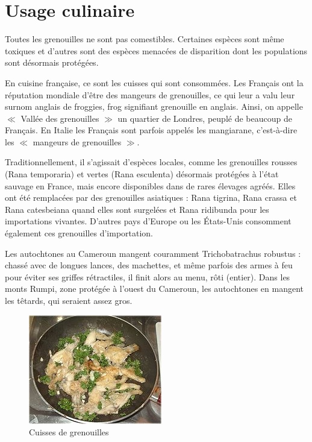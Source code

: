 \section{Usage culinaire}

Toutes les grenouilles ne sont pas comestibles. 
Certaines espèces sont même toxiques et d'autres sont des espèces menacées de disparition dont les populations sont désormais protégées.

En cuisine française, ce sont les cuisses qui sont consommées. 
Les Français ont la réputation mondiale d'être des mangeurs de grenouilles, ce qui leur a valu leur surnom anglais de froggies, frog signifiant grenouille en anglais. 
Ainsi, on appelle $\ll$ Vallée des grenouilles $\gg$ un quartier de Londres, peuplé de beaucoup de Français.
En Italie les Français sont parfois appelés les mangiarane, c'est-à-dire les $\ll$ mangeurs de grenouilles $\gg$.

Traditionnellement, il s'agissait d'espèces locales, comme les grenouilles rousses (Rana temporaria) et vertes (Rana esculenta) désormais protégées à l'état sauvage en France, mais encore disponibles dans de rares élevages agréés. 
Elles ont été remplacées par des grenouilles asiatiques : Rana tigrina, Rana crassa et Rana catesbeiana quand elles sont surgelées et Rana ridibunda pour les importations vivantes.
D'autres pays d'Europe ou les États-Unis consomment également ces grenouilles d'importation.

Les autochtones au Cameroun mangent couramment Trichobatrachus robustus : chassé avec de longues lances, des machettes, et même parfois des armes à feu pour éviter ses griffes rétractiles, il finit alors au menu, rôti (entier). 
Dans les monts Rumpi, zone protégée à l'ouest du Cameroun, les autochtones en mangent les têtards, qui seraient assez gros.

\begin{figure}
	\begin{center}
		\includegraphics[scale=1]{cuisine/miam.JPG}
			\caption{Cuisses de grenouilles}
			\label{fig:gre}
	\end{center}
\end{figure}